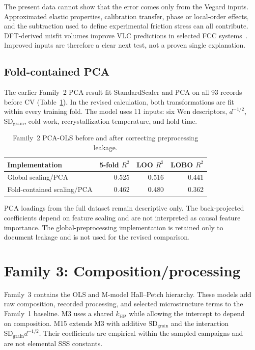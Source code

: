 \documentclass[a4paper,11pt]{article}
\newcommand{\familythree}{Composition/processing}
\begin{document}
The present data cannot show that the error comes only from the Vegard inputs. Approximated elastic properties, calibration transfer, phase or local-order effects, and the subtraction used to define experimental friction stress can all contribute. DFT-derived misfit volumes improve VLC predictions in selected FCC systems~\cite{Moitzi2022}. Improved inputs are therefore a clear next test, not a proven single explanation.

\subsection{Fold-contained PCA}

The earlier Family~2 PCA result fit StandardScaler and PCA on all 93 records before CV (Table~\ref{tab:pca}). In the revised calculation, both transformations are fit within every training fold. The model uses 11 inputs: six Wen descriptors, $d^{-1/2}$, $\mathrm{SD}_{\mathrm{grain}}$, cold work, recrystallization temperature, and hold time.

\begin{table}[H]
\centering
\caption{Family~2 PCA-OLS before and after correcting preprocessing leakage.}
\label{tab:pca}
\begin{tabular}{lrrr}
\toprule
Implementation & 5-fold $R^2$ & LOO $R^2$ & LOBO $R^2$ \\
\midrule
Global scaling/PCA & 0.525 & 0.516 & 0.441 \\
Fold-contained scaling/PCA & 0.462 & 0.480 & 0.362 \\
\bottomrule
\end{tabular}
\end{table}

PCA loadings from the full dataset remain descriptive only. The back-projected coefficients depend on feature scaling and are not interpreted as causal feature importance. The global-preprocessing implementation is retained only to document leakage and is not used for the revised comparison.

\section{Family 3: \familythree}
\label{si:composition}

Family~3 contains the OLS and M-model Hall--Petch hierarchy. These models add raw composition, recorded processing, and selected microstructure terms to the Family~1 baseline. M3 uses a shared $k_{\mathrm{HP}}$ while allowing the intercept to depend on composition. M15 extends M3 with additive $\mathrm{SD}_{\mathrm{grain}}$ and the interaction $\mathrm{SD}_{\mathrm{grain}}d^{-1/2}$. Their coefficients are empirical within the sampled campaigns and are not elemental SSS constants.
\end{document}
